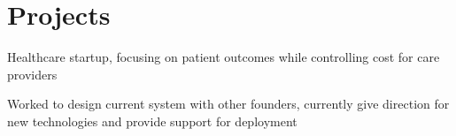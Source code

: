 \documentclass[letterpaper]{deedy-resume}
\begin{document}
\begin{minipage}[t]{0.66\textwidth}
    \section{Projects}

        \begin{tightitemize}
          \item Healthcare startup, focusing on patient outcomes while
            controlling cost for care providers
          \item Worked to design current system with other founders, currently
            give direction for new technologies and provide support for
            deployment
        \end{tightitemize}

  \end{minipage} %
\end{document}
